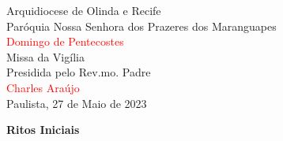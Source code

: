 \documentclass{book}
\begin{document}
\pagestyle{empty}

\begin{center}

    \huge Arquidiocese de Olinda e Recife
    \vspace{.3cm} \\
    \LARGE Paróquia Nossa Senhora dos Prazeres dos Maranguapes
    \vspace{3cm} \\
    \textcolor{red}{\Huge Domingo de Pentecostes}
    \vspace{3cm} \\
    \huge Missa da Vigília
    \vspace{.3cm} \\
    \LARGE Presidida pelo Rev.mo. Padre
    \vspace{.3cm} \\
    \textcolor{red}{\Huge Charles Araújo}
    \vspace{\fill}\\
    \LARGE Paulista, 27 de Maio de 2023

\end{center}

\newpage

\begin{center}

    \textbf{Ritos Iniciais}

\end{center}
\end{document}
